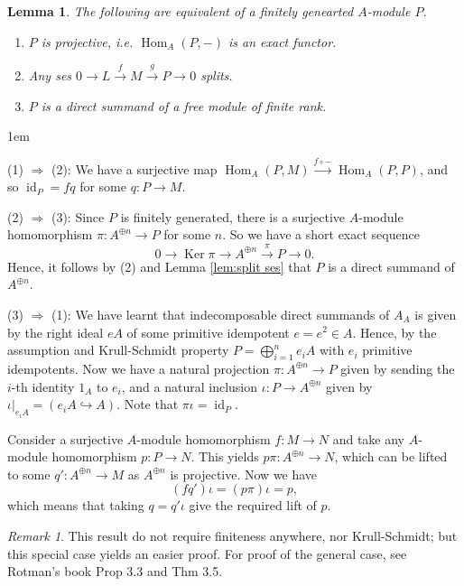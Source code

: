 \documentclass[11pt,a4paper]{article}
\makeatletter
\numberwithin{equation}{section}
\renewenvironment{proof}[1][\proofname]{\par
    \pushQED{\qed}%
    \normalfont \topsep0\p@\@plus6\p@ \labelsep1em\relax
    \trivlist
    \item[\hskip\labelsep\indent
        \bfseries #1]\ignorespaces
    \mbox{}
}{
    \popQED\endtrivlist\@endpefalse
}
\theoremstyle{all}
\newtheorem{lemma}[theorem]{Lemma}
\theoremstyle{remark}
\newtheorem{remark}[theorem]{Remark}
\newcommand{\id}{\operatorname{id}}
\newcommand{\Hom}{\operatorname{Hom}\nolimits}
\newcommand{\Ker}{\operatorname{Ker}\nolimits}
\makeatother
\begin{document}
\begin{lemma}\label{lem:projective equiv cond}
The following are equivalent of a finitely genearted $A$-module $P$.
\begin{enumerate}
\item $P$ is projective, i.e. $\Hom_A(P,-)$ is an exact functor.
\item Any ses $0\to L\xrightarrow{f} M\xrightarrow{g} P\to 0$ splits.
\item $P$ is a direct summand of a free module of finite rank.
\end{enumerate}
\end{lemma}
\begin{proof}
(1) $\Rightarrow$ (2): We have a surjective map $\Hom_A(P,M)\xrightarrow{f\circ-}\Hom_A(P,P)$, and so $\id_P=fq$ for some $q:P\to M$.

(2) $\Rightarrow$ (3): Since $P$ is finitely generated, there is a surjective $A$-module homomorphism $\pi:A^{\oplus n}\to P$ for some $n$.  So we have a short exact sequence \[
0 \to \Ker\pi \to A^{\oplus n} \xrightarrow{\pi} P\to 0.
\]
Hence, it follows by (2) and Lemma \ref{lem:split ses} that $P$ is a direct summand of $A^{\oplus n}$.

(3) $\Rightarrow$ (1):  We have learnt that indecomposable direct summands of $A_A$ is given by the right ideal $eA$ of some primitive idempotent $e=e^2\in A$.  Hence, by the assumption and Krull-Schmidt property $P=\bigoplus_{i=1}^n e_iA$ with $e_i$ primitive idempotents.  Now we have a natural projection $\pi:A^{\oplus n}\to P$ given by sending the $i$-th identity $1_A$ to $e_i$, and a natural inclusion $\iota: P\to A^{\oplus n}$ given by $\iota|_{e_iA}=(e_i A\hookrightarrow A)$.
Note that $\pi\iota =\id_P$.

Consider a surjective $A$-module homomorphism $f:M\to N$ and take any $A$-module homomorphism $p:P\to N$.
This yields $p\pi : A^{\oplus n}\to N$, which can be lifted to some $q':A^{\oplus n}\to M$ as $A^{\oplus n}$ is projective.
Now we have
\[
(fq')\iota=(p\pi)\iota = p,
\]
which means that taking $q=q'\iota$ give the required lift of $p$.
\end{proof}
\begin{remark}
This result do not require finiteness anywhere, nor Krull-Schmidt; but this special case yields an easier proof.  For proof of the general case, see Rotman's book Prop 3.3 and Thm 3.5.
\end{remark}
\end{document}
